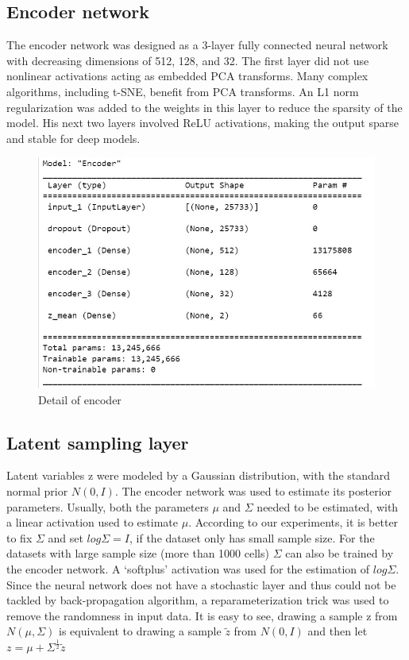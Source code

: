 \documentclass[12 pts]{article}
\begin{document}
\subsection*{Encoder network}
The encoder network was designed as a 3-layer fully connected neural network with decreasing dimensions of 512, 128, and 32. The first layer did not use nonlinear activations acting as embedded PCA transforms. Many complex algorithms, including t-SNE, benefit from PCA transforms. An L1 norm regularization was added to the weights in this layer to reduce the sparsity of the model. His next two layers involved ReLU activations, making the output sparse and stable for deep models.


\begin{figure}[H]
\centering
\includegraphics[scale=0.85]{encoder}
\caption{Detail of encoder}
\label{fig: encoder}
\end{figure}


\subsection*{Latent sampling layer}
Latent variables z were modeled by a Gaussian distribution, with the standard normal prior $N(0,I)$. The encoder network was used to estimate its posterior parameters. Usually, both the parameters $\mu$ and $\Sigma$ needed to be estimated, with a linear activation used to estimate $\mu$. According to our experiments, it is better to fix $\Sigma$ and set $log\Sigma = I$, if the dataset only has small sample size. For the datasets with large sample size (more than 1000 cells) $\Sigma$ can also be trained by the encoder network. A ‘softplus’ activation was used for the estimation of $log\Sigma$. Since the neural network does not have a stochastic layer and thus could not be tackled by back-propagation algorithm, a reparameterization trick was used to remove the randomness in input data. It is easy to see, drawing a sample z from $N(\mu, \Sigma)$ is equivalent to drawing a sample $\tilde{z}$ from $N(0,I)$ and
then let $z = \mu + \Sigma^\frac{1}{2}\tilde{z}$
\end{document}
